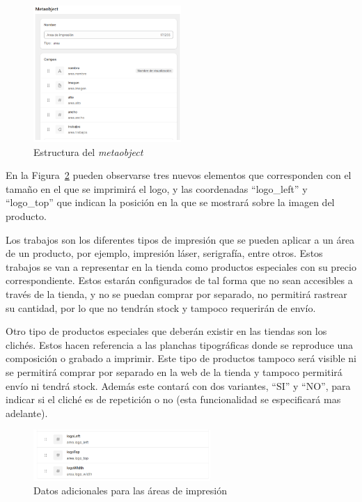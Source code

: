 \documentclass[11pt]{article}
\begin{document}
\begin{figure}[H]
    \centering
    \includegraphics[width=0.5\textwidth]{imagenesUS2/creacionMetaobjeto.png}
    \caption{\label{fig:metaobjeto}Estructura del \textit{metaobject}}
    \vspace{\fill}
\end{figure}

En la Figura~\ref{fig:metaobjetoAdicional} pueden observarse tres nuevos elementos que corresponden con el tamaño en el que se imprimirá el logo, y las coordenadas ``logo\_left'' 
y ``logo\_top'' que indican la posición en la que se mostrará sobre la imagen del producto.

Los trabajos son los diferentes tipos de impresión que se pueden aplicar a un área de un producto, por ejemplo, impresión láser, serigrafía, entre otros.
Estos trabajos se van a representar en la tienda como productos especiales con su precio correspondiente. Estos estarán configurados de tal forma que no sean accesibles a través de la tienda, y
no se puedan comprar por separado, no permitirá rastrear su cantidad, por lo que no tendrán stock y tampoco requerirán de envío.

Otro tipo de productos especiales que deberán existir en las tiendas son los clichés. Estos hacen referencia a las planchas tipográficas donde se reproduce una composición o grabado
a imprimir. Este tipo de productos tampoco será visible ni se permitirá comprar por separado en la web de la tienda y tampoco permitirá envío  ni tendrá stock.
Además este contará con dos variantes, ``SI'' y ``NO'', para indicar si el cliché es de repetición o no (esta funcionalidad se especificará mas adelante).


\begin{figure}[H]
    \centering
    \includegraphics[width=0.6\textwidth]{imagenesUS2/elementosMetaobjectAdicionales.png}
    \caption{\label{fig:metaobjetoAdicional}Datos adicionales para las áreas de impresión}
    \vspace{\fill}
\end{figure}
\end{document}
